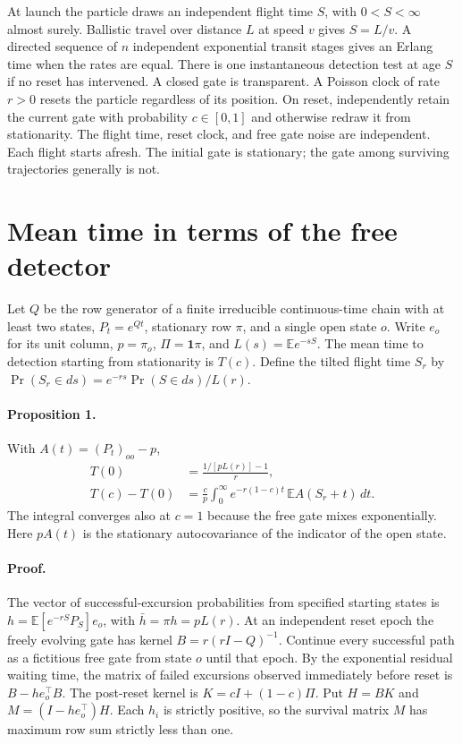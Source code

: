 \documentclass[11pt]{article}
\newcommand{\E}{\mathbb E}
\newcommand{\one}{\mathbf 1}
\begin{document}
At launch the particle draws an independent flight time $S$, with $0<S<\infty$ almost surely. Ballistic travel over distance $L$ at speed $v$ gives $S=L/v$. A directed sequence of $n$ independent exponential transit stages gives an Erlang time when the rates are equal. There is one instantaneous detection test at age $S$ if no reset has intervened. A closed gate is transparent. A Poisson clock of rate $r>0$ resets the particle regardless of its position. On reset, independently retain the current gate with probability $c\in[0,1]$ and otherwise redraw it from stationarity. The flight time, reset clock, and free gate noise are independent. Each flight starts afresh. The initial gate is stationary; the gate among surviving trajectories generally is not.

\section{Mean time in terms of the free detector}
Let $Q$ be the row generator of a finite irreducible continuous-time chain with at least two states, $P_t=e^{Qt}$, stationary row $\pi$, and a single open state $o$. Write $e_o$ for its unit column, $p=\pi_o$, $\Pi=\one\pi$, and $L(s)=\E e^{-sS}$. The mean time to detection starting from stationarity is $T(c)$. Define the tilted flight time $S_r$ by $\Pr(S_r\in ds)=e^{-rs}\Pr(S\in ds)/L(r)$.

\paragraph{Proposition 1.} With $A(t)=(P_t)_{oo}-p$,
\begin{align}
 T(0)&=\frac{1/[pL(r)]-1}{r}, \label{eq:base}\\
 T(c)-T(0)&=\frac{c}{p}\int_0^\infty
 e^{-r(1-c)t}\,\E A(S_r+t)\,dt . \label{eq:main}
\end{align}
The integral converges also at $c=1$ because the free gate mixes exponentially. Here $pA(t)$ is the stationary autocovariance of the indicator of the open state.

\paragraph{Proof.}
The vector of successful-excursion probabilities from specified starting states is $h=\E[e^{-rS}P_S]e_o$, with $\bar h=\pi h=pL(r)$. At an independent reset epoch the freely evolving gate has kernel $B=r(rI-Q)^{-1}$. Continue every successful path as a fictitious free gate from state $o$ until that epoch. By the exponential residual waiting time, the matrix of failed excursions observed immediately before reset is $B-h e_o^\top B$. The post-reset kernel is $K=cI+(1-c)\Pi$. Put $H=BK$ and $M=(I-h e_o^\top)H$. Each $h_i$ is strictly positive, so the survival matrix $M$ has maximum row sum strictly less than one.
\end{document}
